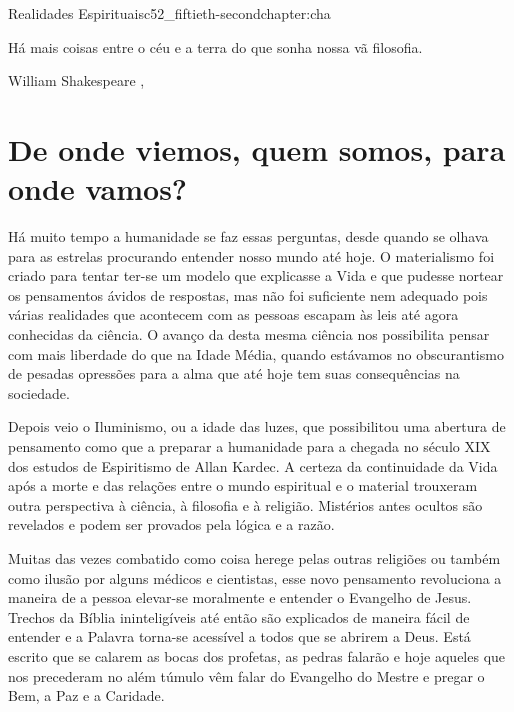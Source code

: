 \begin{chapterpage}{Realidades Espirituais}{c52_fiftieth-secondchapter:cha}
 
\begin{myquotation}Há mais coisas entre o céu e a terra do que sonha nossa vã filosofia.
\par\vspace*{15mm}
\mbox{}\hfill \emdash{}William Shakespeare
, %
\par\end{myquotation}

\end{chapterpage}



\section{De onde viemos, quem somos, para onde vamos?}\label{c1_basicformatting:sec}

\emdash{}Há muito tempo a humanidade se faz essas perguntas, desde quando se olhava para as estrelas procurando entender nosso mundo até hoje. O materialismo foi criado para tentar ter-se um modelo que explicasse a Vida e que pudesse nortear os pensamentos ávidos de respostas, mas não foi suficiente nem adequado pois várias realidades que acontecem com as pessoas escapam às leis até agora conhecidas da ciência. O avanço da desta mesma ciência nos possibilita pensar com mais liberdade do que na Idade Média, quando estávamos no obscurantismo de pesadas opressões para a alma que até hoje tem suas consequências na sociedade.

\emdash{}Depois veio o Iluminismo, ou a idade das luzes, que possibilitou uma abertura de pensamento como que a preparar a humanidade para a chegada no século XIX dos estudos de Espiritismo de Allan Kardec. A certeza da continuidade da Vida após a morte e das relações entre o mundo espiritual e o material trouxeram outra perspectiva à ciência, à filosofia e à religião. Mistérios antes ocultos são revelados e podem ser provados pela lógica e a razão. 

\emdash{}Muitas das vezes combatido como coisa herege pelas outras religiões ou também como ilusão por alguns médicos e cientistas, esse novo pensamento revoluciona a maneira de a pessoa elevar-se moralmente e entender o Evangelho de Jesus. Trechos da Bíblia ininteligíveis até então são explicados de maneira fácil de entender e a Palavra torna-se acessível a todos que se abrirem a Deus. Está escrito que se calarem as bocas dos profetas, as pedras falarão e hoje aqueles que nos precederam no além túmulo vêm falar do Evangelho do Mestre e pregar o Bem, a Paz e a Caridade.

